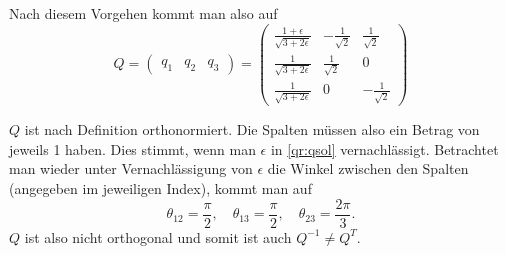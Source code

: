Nach diesem Vorgehen kommt man also auf
\begin{equation}
Q=
\begin{pmatrix}
q_1&q_2&q_3
\end{pmatrix}=
\begin{pmatrix}
\frac{1+\epsilon}{\sqrt{3+2\epsilon}}&-\frac{1}{\sqrt{2}}&\frac{1}{\sqrt{2}}\\
\frac{1}{\sqrt{3+2\epsilon}}&\frac{1}{\sqrt{2}}&0\\
\frac{1}{\sqrt{3+2\epsilon}}&0&-\frac{1}{\sqrt{2}}
\end{pmatrix}\label{qr:qsol}
\end{equation}

$Q$ ist nach Definition orthonormiert. Die Spalten müssen also ein Betrag von jeweils 1 haben. Dies stimmt, wenn man $\epsilon$ in \ref{qr:qsol} vernachlässigt.
Betrachtet man wieder unter Vernachlässigung von $\epsilon$ die Winkel zwischen den Spalten (angegeben im jeweiligen Index), kommt man auf
\begin{equation*}
\theta_{12}=\frac{\pi}{2},\quad \theta_{13}=\frac{\pi}{2}, \quad \theta_{23}=\frac{2\pi}{3}.
\end{equation*}
$Q$ ist also nicht orthogonal und somit ist auch $Q^{-1}\ne Q^T$.

